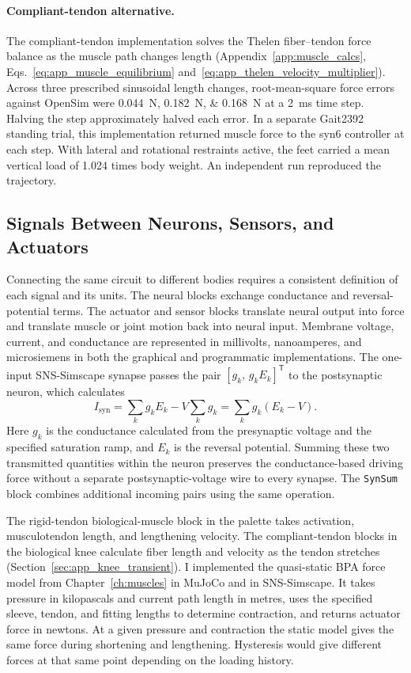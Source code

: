 \paragraph{Compliant-tendon alternative.}
The compliant-tendon implementation solves the Thelen fiber--tendon force balance as the muscle path changes length (Appendix~\ref{app:muscle_calcs}, Eqs.~\ref{eq:app_muscle_equilibrium} and~\ref{eq:app_thelen_velocity_multiplier}). Across three prescribed sinusoidal length changes, root-mean-square force errors against OpenSim were \qtylist{0.044;0.182;0.168}{\newton} at a \qty{2}{\milli\second} time step. Halving the step approximately halved each error. In a separate Gait2392 standing trial, this implementation returned muscle force to the syn6 controller at each step. With lateral and rotational restraints active, the feet carried a mean vertical load of 1.024 times body weight. An independent run reproduced the trajectory.

\subsection{Signals Between Neurons, Sensors, and Actuators}\label{sec:app_signal_contracts}

Connecting the same circuit to different bodies requires a consistent definition of each signal and its units. The neural blocks exchange conductance and reversal-potential terms. The actuator and sensor blocks translate neural output into force and translate muscle or joint motion back into neural input. Membrane voltage, current, and conductance are represented in millivolts, nanoamperes, and microsiemens in both the graphical and programmatic implementations. The one-input SNS-Simscape synapse passes the pair $[g_k,\,g_kE_k]^{\mathsf T}$ to the postsynaptic neuron, which calculates
\begin{equation}
I_{\mathrm{syn}}=\sum_k g_kE_k-V\sum_k g_k
=\sum_k g_k(E_k-V).
\label{eq:app_synaptic_contract}
\end{equation}
Here $g_k$ is the conductance calculated from the presynaptic voltage and the specified saturation ramp, and $E_k$ is the reversal potential. Summing these two transmitted quantities within the neuron preserves the conductance-based driving force without a separate postsynaptic-voltage wire to every synapse. The \texttt{SynSum} block combines additional incoming pairs using the same operation.

The rigid-tendon biological-muscle block in the palette takes activation, musculotendon length, and lengthening velocity. The compliant-tendon blocks in the biological knee calculate fiber length and velocity as the tendon stretches (Section~\ref{sec:app_knee_transient}). I implemented the quasi-static BPA force model from Chapter~\ref{ch:muscles} in MuJoCo and in SNS-Simscape. It takes pressure in kilopascals and current path length in metres, uses the specified sleeve, tendon, and fitting lengths to determine contraction, and returns actuator force in newtons. At a given pressure and contraction the static model gives the same force during shortening and lengthening. Hysteresis would give different forces at that same point depending on the loading history.


